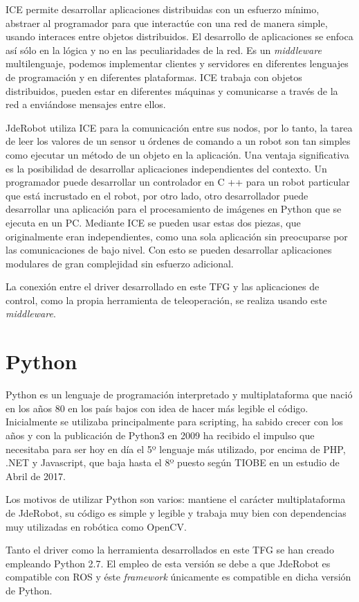 ICE permite desarrollar aplicaciones distribuidas con un esfuerzo mínimo, abstraer al programador para que interactúe con una red de manera simple, usando interaces entre objetos distribuidos. El desarrollo de aplicaciones se enfoca así sólo en la lógica y no en las peculiaridades de la red. Es un \textit{middleware} multilenguaje, podemos implementar clientes y servidores en diferentes lenguajes de programación y en diferentes plataformas. ICE trabaja con objetos distribuidos, pueden estar en diferentes máquinas y comunicarse a través de la red a enviándose mensajes entre ellos.

JdeRobot utiliza ICE para la comunicación entre sus nodos, por lo tanto, la tarea de leer
los valores de un sensor u órdenes de comando a un robot son tan simples como ejecutar un método de un objeto en la aplicación. Una ventaja significativa es la posibilidad de desarrollar aplicaciones independientes del contexto. Un programador puede desarrollar un controlador en C ++ para un robot particular que está incrustado en el robot, por otro lado, otro desarrollador puede desarrollar una aplicación para el procesamiento de imágenes en Python que se ejecuta en un PC. Mediante ICE se pueden usar estas dos piezas, que originalmente eran independientes, como una sola aplicación sin preocuparse por las comunicaciones de bajo nivel. Con esto se pueden desarrollar aplicaciones modulares de gran complejidad sin esfuerzo adicional.

La conexión entre el driver desarrollado en este TFG y las aplicaciones de control, como la propia herramienta de teleoperación, se realiza usando este \textit{middleware}.

\section{Python}
\label{sec:python}

Python\cite{python} es un lenguaje de programaci\'on interpretado y multiplataforma que naci\'o en los años 80 en los país bajos con idea de hacer más legible el c\'odigo.
Inicialmente se utilizaba principalmente para scripting, ha sabido crecer con los años y con la publicaci\'on de Python3 en 2009 ha recibido el impulso que necesitaba para ser hoy en día el 5º lenguaje más utilizado, por encima de PHP, .NET y Javascript, que baja hasta el 8º puesto según TIOBE en un estudio de Abril de 2017.

Los motivos de utilizar Python son varios: mantiene el carácter multiplataforma de JdeRobot, su c\'odigo es simple y legible y trabaja muy bien con dependencias muy utilizadas en rob\'otica como OpenCV.

Tanto el driver como la herramienta desarrollados en este TFG se han creado empleando Python 2.7. El empleo de esta versión se debe a que JdeRobot es compatible con ROS y éste \textit{framework} únicamente es compatible en dicha versión de Python. 


\cleardoublepage